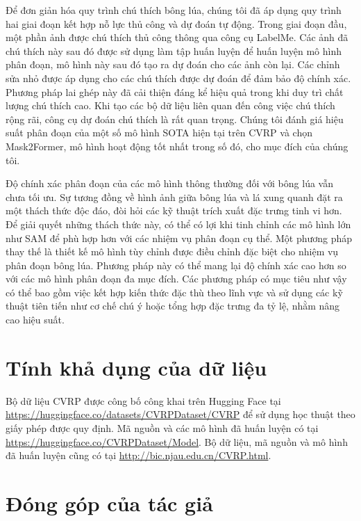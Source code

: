 \documentclass[12pt, a4paper]{article}
\begin{document}
Để đơn giản hóa quy trình chú thích bông lúa, chúng tôi đã áp dụng quy trình hai giai đoạn
kết hợp nỗ lực thủ công và dự đoán tự động. Trong giai đoạn đầu, một phần ảnh được chú thích
thủ công thông qua công cụ LabelMe. Các ảnh đã chú thích này sau đó được sử dụng làm tập
huấn luyện để huấn luyện mô hình phân đoạn, mô hình này sau đó tạo ra dự đoán cho các ảnh
còn lại. Các chỉnh sửa nhỏ được áp dụng cho các chú thích được dự đoán để đảm bảo độ chính
xác. Phương pháp lai ghép này đã cải thiện đáng kể hiệu quả trong khi duy trì chất lượng chú
thích cao. Khi tạo các bộ dữ liệu liên quan đến công việc chú thích rộng rãi, công cụ dự đoán
chú thích là rất quan trọng. Chúng tôi đánh giá hiệu suất phân đoạn của một số mô hình SOTA
hiện tại trên CVRP và chọn Mask2Former, mô hình hoạt động tốt nhất trong số đó, cho mục đích
của chúng tôi.

Độ chính xác phân đoạn của các mô hình thông thường đối với bông lúa vẫn chưa tối ưu. Sự
tương đồng về hình ảnh giữa bông lúa và lá xung quanh đặt ra một thách thức độc đáo, đòi hỏi
các kỹ thuật trích xuất đặc trưng tinh vi hơn. Để giải quyết những thách thức này, có thể có
lợi khi tinh chỉnh các mô hình lớn như SAM để phù hợp hơn với các nhiệm vụ phân đoạn cụ thể.
Một phương pháp thay thế là thiết kế mô hình tùy chỉnh được điều chỉnh đặc biệt cho nhiệm vụ
phân đoạn bông lúa. Phương pháp này có thể mang lại độ chính xác cao hơn so với các mô hình
phân đoạn đa mục đích. Các phương pháp có mục tiêu như vậy có thể bao gồm việc kết hợp kiến
thức đặc thù theo lĩnh vực và sử dụng các kỹ thuật tiên tiến như cơ chế chú ý hoặc tổng hợp
đặc trưng đa tỷ lệ, nhằm nâng cao hiệu suất.

\section*{Tính khả dụng của dữ liệu}

Bộ dữ liệu CVRP được công bố công khai trên Hugging Face tại
\url{https://huggingface.co/datasets/CVRPDataset/CVRP} để sử dụng học thuật theo giấy phép
được quy định. Mã nguồn và các mô hình đã huấn luyện có tại
\url{https://huggingface.co/CVRPDataset/Model}. Bộ dữ liệu, mã nguồn và mô hình đã huấn luyện
cũng có tại \url{http://bic.njau.edu.cn/CVRP.html}.

\section*{Đóng góp của tác giả}
\end{document}
